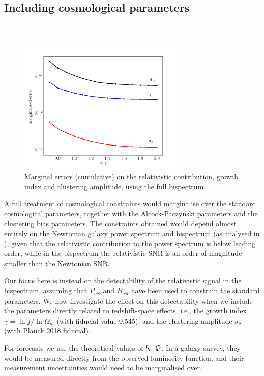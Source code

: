 \subsection{Including cosmological parameters}
~\\
\begin{figure}[ht]
\centering
\includegraphics[width=8.0cm]{fig/gamma_sigma8_AD-eps-converted-to}
\caption{Marginal errors (cumulative) on the relativistic contribution, growth index and clustering amplitude, using the full bispectrum.} \label{sig}
\end{figure}
{A full treatment of cosmological constraints would marginalise over the standard cosmological parameters, together with the Alcock-Paczynski parameters and the clustering bias parameters. The constraints obtained would depend almost entirely on the Newtonian galaxy power spectrum and bispectrum (as analysed in \cite{Yankelevich:2018uaz}), given that the relativistic contribution to the power spectrum is below leading order, while in the bispectrum the relativistic SNR is  an order of magnitude smaller than the Newtonian SNR. 

Our focus here is instead on the detectability of the relativistic signal in the bispectrum, {assuming that $P_{g\mathrm{N}}$ and $B_{g\mathrm{N}}$ have been used to constrain the standard parameters.}
We now investigate the effect on this detectability when we include the parameters directly related to redshift-space effects, i.e.,  the growth index $\gamma=\ln f/ \ln\Omega_m$ (with fiducial value 0.545), and the clustering amplitude $\sigma_8$ (with Planck 2018 fiducial).} 
{For forecasts we use the theoretical values of $b_e, \mathcal{Q}$. In a galaxy survey, they would be measured directly from the observed luminosity function, and their measurement uncertainties would need to be marginalised over.}


